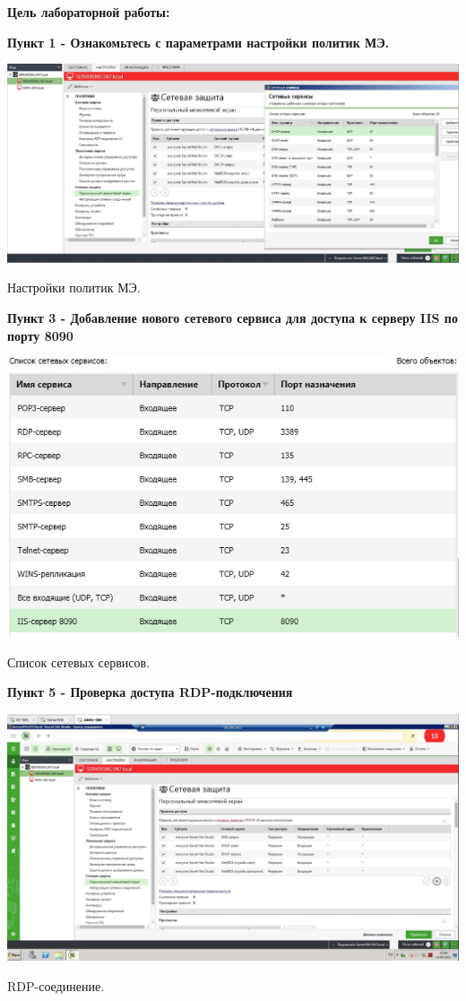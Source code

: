 \documentclass[a4paper,14pt]{extarticle}
\begin{document}
    \textbf{Цель лабораторной работы:}

    \textbf{Пункт 1 - Ознакомьтесь с параметрами настройки политик МЭ.}
    \begin{center}
        \includegraphics[scale=0.3]{pics/1.jpg}

       Настройки политик МЭ.
    \end{center}

    \textbf{Пункт 3 - Добавление нового сетевого сервиса для доступа к серверу IIS по порту 8090}
    \begin{center}
        \includegraphics[scale=0.6]{pics/3.jpg}

       Список сетевых сервисов.
    \end{center}

    \newpage
    \textbf{Пункт 5 - Проверка доступа RDP-подключения}
    \begin{center}
        \includegraphics[scale=0.3]{pics/5.jpg}

        RDP-соединение.
    \end{center}
\end{document}

